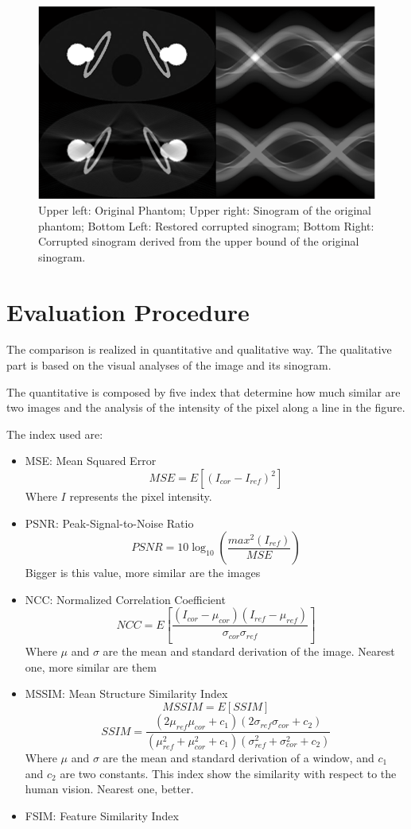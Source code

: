 \begin{figure}[h]
\centering
\includegraphics[scale=0.7]{img/artefact_generation}
\caption{{Upper left: Original Phantom; Upper right: Sinogram of the original phantom; 
Bottom Left: Restored corrupted sinogram; Bottom Right: Corrupted sinogram derived from the upper bound of the original sinogram.}}\label{artefact_generation}
\end{figure}

\section{Evaluation Procedure}

The comparison is realized in quantitative and qualitative way. The qualitative part is based on the visual analyses of the image and its sinogram.

The quantitative is composed by five index that determine how much similar are two images and the analysis of the intensity of the pixel along a line in the figure.

The index used are: 
\begin{itemize}
\item MSE: Mean Squared Error
\[ MSE = E[(I_{cor}-I_{ref})^2] \]
Where $I$ represents the pixel intensity.

\item PSNR: Peak-Signal-to-Noise Ratio
\[PSNR = 10\log_{10}\left({\frac{max^2(I_{ref})}{MSE}}\right) \]
Bigger is this value, more similar are the images

\item NCC: Normalized Correlation Coefficient
\[NCC = E\left[\frac{(I_{cor}-\mu_{cor})(I_{ref}-\mu_{ref})}{\sigma_{cor}\sigma_{ref}}\right] \]
Where $\mu$ and $\sigma$ are the mean and standard derivation of the image.
Nearest one, more similar are them

\item MSSIM: Mean Structure Similarity Index
\[MSSIM = E[SSIM] \]
\[ SSIM = \frac{(2\mu_{ref}\mu_{cor}+c_1)(2\sigma_{ref}\sigma_{cor}+c_2)}{(\mu_{ref}^2 +\mu_{cor}^2+c_1)(\sigma_{ref}^2+\sigma_{cor}^2+c_2)} \]
Where  $\mu$ and $\sigma$ are the mean and standard derivation of a window, and  $c_1$ and $c_2$ are two constants.
This index show the similarity with respect to the human vision. Nearest one, better.

\item FSIM: Feature Similarity Index
\end{itemize}

